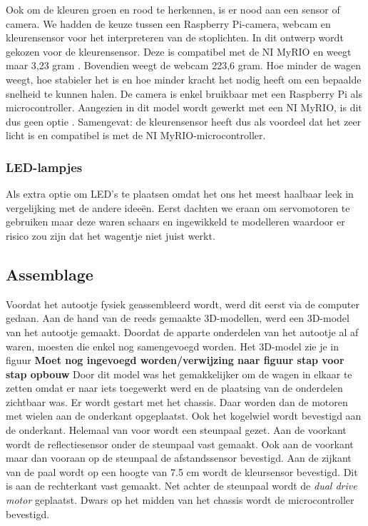 \documentclass[a4paper,twoside,kulak]{kulakreport} %
\begin{document}
Ook om de kleuren groen en rood te herkennen, is er nood aan een sensor of camera. We hadden de keuze tussen een Raspberry Pi-camera, webcam en kleurensensor voor het interpreteren van de stoplichten. In dit ontwerp wordt gekozen voor de kleurensensor. Deze is compatibel met de NI MyRIO en weegt maar 3,23 gram \cite{Webcam,TCS34725KleurSensorBOB}. Bovendien weegt de webcam 223,6 gram. Hoe minder de wagen weegt, hoe stabieler het is en hoe minder kracht het nodig heeft om een bepaalde snelheid te kunnen halen. De camera is enkel bruikbaar met een Raspberry Pi als microcontroller. Aangezien in dit model wordt gewerkt met een NI MyRIO, is dit dus geen optie \cite{RPi-camera}. Samengevat: de kleurensensor heeft dus als voordeel dat het zeer licht is en compatibel is met de NI MyRIO-microcontroller.
\label{Sensoren}
~

\subsubsection{LED-lampjes}\label{LED-lampjes}
Als extra optie om LED's te plaatsen omdat het ons het meest haalbaar leek in vergelijking met de andere ideeën. Eerst dachten we eraan om servomotoren te gebruiken maar deze waren schaars en ingewikkeld te modelleren waardoor er risico zou zijn dat het wagentje niet juist werkt.


\subsection{Assemblage}
Voordat het autootje fysiek geassembleerd wordt, werd dit eerst via de computer gedaan. Aan de hand van de reeds gemaakte 3D-modellen, werd een 3D-model van het autootje gemaakt. Doordat de apparte onderdelen van het autootje al af waren, moesten die enkel nog samengevoegd worden. Het 3D-model zie je in figuur
{\bf{\Large Moet nog ingevoegd worden/verwijzing naar figuur stap voor stap opbouw}}
Door dit model was het gemakkelijker om de wagen in elkaar te zetten omdat er naar iets toegewerkt werd en de plaatsing van de onderdelen zichtbaar was. Er wordt gestart met het chassis. Daar worden dan de motoren met wielen aan de onderkant opgeplaatst. Ook het kogelwiel wordt bevestigd aan de onderkant. Helemaal van voor wordt een steunpaal gezet. Aan de voorkant wordt de reflectiesensor onder de steunpaal vast gemaakt. Ook aan de voorkant maar dan vooraan op de steunpaal de afstandssensor bevestigd. Aan de zijkant van de paal wordt op een hoogte van 7.5 cm wordt de kleursensor bevestigd. Dit is aan de rechterkant vast gemaakt. Net achter de steunpaal wordt de {\it dual drive motor} geplaatst. Dwars op het midden van het chassis wordt de microcontroller bevestigd.
\end{document}
